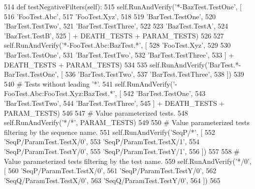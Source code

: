 \begin{DoxyCode}
514   \textcolor{keyword}{def }testNegativeFilters(self):
515     self.RunAndVerify(\textcolor{stringliteral}{'*-BazTest.TestOne'}, [
516         \textcolor{stringliteral}{'FooTest.Abc'},
517         \textcolor{stringliteral}{'FooTest.Xyz'},
518 
519         \textcolor{stringliteral}{'BarTest.TestOne'},
520         \textcolor{stringliteral}{'BarTest.TestTwo'},
521         \textcolor{stringliteral}{'BarTest.TestThree'},
522 
523         \textcolor{stringliteral}{'BazTest.TestA'},
524         \textcolor{stringliteral}{'BazTest.TestB'},
525         ] + DEATH\_TESTS + PARAM\_TESTS)
526 
527     self.RunAndVerify(\textcolor{stringliteral}{'*-FooTest.Abc:BazTest.*'}, [
528         \textcolor{stringliteral}{'FooTest.Xyz'},
529 
530         \textcolor{stringliteral}{'BarTest.TestOne'},
531         \textcolor{stringliteral}{'BarTest.TestTwo'},
532         \textcolor{stringliteral}{'BarTest.TestThree'},
533         ] + DEATH\_TESTS + PARAM\_TESTS)
534 
535     self.RunAndVerify(\textcolor{stringliteral}{'BarTest.*-BarTest.TestOne'}, [
536         \textcolor{stringliteral}{'BarTest.TestTwo'},
537         \textcolor{stringliteral}{'BarTest.TestThree'},
538         ])
539 
540     \textcolor{comment}{# Tests without leading '*'.}
541     self.RunAndVerify(\textcolor{stringliteral}{'-FooTest.Abc:FooTest.Xyz:BazTest.*'}, [
542         \textcolor{stringliteral}{'BarTest.TestOne'},
543         \textcolor{stringliteral}{'BarTest.TestTwo'},
544         \textcolor{stringliteral}{'BarTest.TestThree'},
545         ] + DEATH\_TESTS + PARAM\_TESTS)
546 
547     \textcolor{comment}{# Value parameterized tests.}
548     self.RunAndVerify(\textcolor{stringliteral}{'*/*'}, PARAM\_TESTS)
549 
550     \textcolor{comment}{# Value parameterized tests filtering by the sequence name.}
551     self.RunAndVerify(\textcolor{stringliteral}{'SeqP/*'}, [
552         \textcolor{stringliteral}{'SeqP/ParamTest.TestX/0'},
553         \textcolor{stringliteral}{'SeqP/ParamTest.TestX/1'},
554         \textcolor{stringliteral}{'SeqP/ParamTest.TestY/0'},
555         \textcolor{stringliteral}{'SeqP/ParamTest.TestY/1'},
556         ])
557 
558     \textcolor{comment}{# Value parameterized tests filtering by the test name.}
559     self.RunAndVerify(\textcolor{stringliteral}{'*/0'}, [
560         \textcolor{stringliteral}{'SeqP/ParamTest.TestX/0'},
561         \textcolor{stringliteral}{'SeqP/ParamTest.TestY/0'},
562         \textcolor{stringliteral}{'SeqQ/ParamTest.TestX/0'},
563         \textcolor{stringliteral}{'SeqQ/ParamTest.TestY/0'},
564         ])
565 
\end{DoxyCode}
